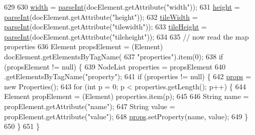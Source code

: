 \begin{DoxyCode}
629 
630             \mbox{\hyperlink{classorg_1_1newdawn_1_1slick_1_1tiled_1_1_tiled_map_a13b00efd90dfee0ccc7474310e40199e}{width}} = \mbox{\hyperlink{classorg_1_1newdawn_1_1slick_1_1tiled_1_1_tiled_map_a8958f06ac942b890600b3c7f92bfb9be}{parseInt}}(docElement.getAttribute(\textcolor{stringliteral}{"width"}));
631             \mbox{\hyperlink{classorg_1_1newdawn_1_1slick_1_1tiled_1_1_tiled_map_a5f9af8e6eb820e35327c4290d14c0bd7}{height}} = \mbox{\hyperlink{classorg_1_1newdawn_1_1slick_1_1tiled_1_1_tiled_map_a8958f06ac942b890600b3c7f92bfb9be}{parseInt}}(docElement.getAttribute(\textcolor{stringliteral}{"height"}));
632             \mbox{\hyperlink{classorg_1_1newdawn_1_1slick_1_1tiled_1_1_tiled_map_a35bfb6f4f23b344d4ad3f9bda198093e}{tileWidth}} = \mbox{\hyperlink{classorg_1_1newdawn_1_1slick_1_1tiled_1_1_tiled_map_a8958f06ac942b890600b3c7f92bfb9be}{parseInt}}(docElement.getAttribute(\textcolor{stringliteral}{"tilewidth"}));
633             \mbox{\hyperlink{classorg_1_1newdawn_1_1slick_1_1tiled_1_1_tiled_map_aa521f50d236247a335994bba33b0baa7}{tileHeight}} = \mbox{\hyperlink{classorg_1_1newdawn_1_1slick_1_1tiled_1_1_tiled_map_a8958f06ac942b890600b3c7f92bfb9be}{parseInt}}(docElement.getAttribute(\textcolor{stringliteral}{"tileheight"}));
634 
635             \textcolor{comment}{// now read the map properties}
636             Element propsElement = (Element) docElement.getElementsByTagName(
637                     \textcolor{stringliteral}{"properties"}).item(0);
638             \textcolor{keywordflow}{if} (propsElement != null) \{
639                 NodeList properties = propsElement
640                         .getElementsByTagName(\textcolor{stringliteral}{"property"});
641                 \textcolor{keywordflow}{if} (properties != null) \{
642                     \mbox{\hyperlink{classorg_1_1newdawn_1_1slick_1_1tiled_1_1_tiled_map_ace934059dd995f4bda5f4c1534df9d30}{props}} = \textcolor{keyword}{new} Properties();
643                     \textcolor{keywordflow}{for} (\textcolor{keywordtype}{int} p = 0; p < properties.getLength(); p++) \{
644                         Element propElement = (Element) properties.item(p);
645 
646                         String name = propElement.getAttribute(\textcolor{stringliteral}{"name"});
647                         String value = propElement.getAttribute(\textcolor{stringliteral}{"value"});
648                         \mbox{\hyperlink{classorg_1_1newdawn_1_1slick_1_1tiled_1_1_tiled_map_ace934059dd995f4bda5f4c1534df9d30}{props}}.setProperty(name, value);
649                     \}
650                 \}
651             \}

\end{DoxyCode}
